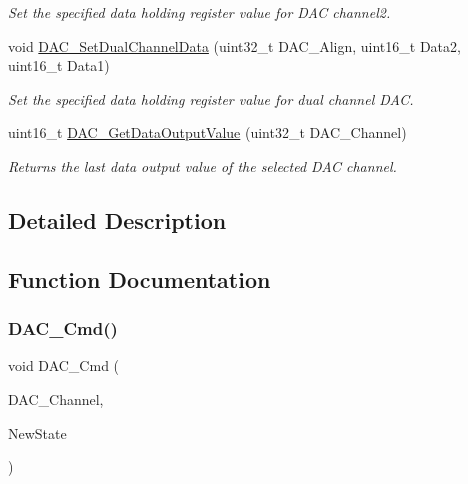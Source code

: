 \begin{DoxyCompactItemize}
\begin{DoxyCompactList}\small\item\em Set the specified data holding register value for D\+AC channel2. \end{DoxyCompactList}\item 
void \hyperlink{group___d_a_c___private___functions_ga4ca2cfdf56ab35a23f2517f23d7fbb24}{D\+A\+C\+\_\+\+Set\+Dual\+Channel\+Data} (uint32\+\_\+t D\+A\+C\+\_\+\+Align, uint16\+\_\+t Data2, uint16\+\_\+t Data1)
\begin{DoxyCompactList}\small\item\em Set the specified data holding register value for dual channel D\+AC. \end{DoxyCompactList}\item 
uint16\+\_\+t \hyperlink{group___d_a_c___private___functions_ga51274838de1e5dd012a82d7f44d7a50b}{D\+A\+C\+\_\+\+Get\+Data\+Output\+Value} (uint32\+\_\+t D\+A\+C\+\_\+\+Channel)
\begin{DoxyCompactList}\small\item\em Returns the last data output value of the selected D\+AC channel. \end{DoxyCompactList}\end{DoxyCompactItemize}


\subsection{Detailed Description}


\subsection{Function Documentation}
\mbox{\label{group___d_a_c___private___functions_ga323e61530d7fa9396c3bce9edb61f733}} 
\subsubsection{\texorpdfstring{D\+A\+C\+\_\+\+Cmd()}{DAC\_Cmd()}}
{\footnotesize\ttfamily void D\+A\+C\+\_\+\+Cmd (\begin{DoxyParamCaption}\item[{uint32\+\_\+t}]{D\+A\+C\+\_\+\+Channel,  }\item[{\hyperlink{group___exported__types_gac9a7e9a35d2513ec15c3b537aaa4fba1}{Functional\+State}}]{New\+State }\end{DoxyParamCaption})}



